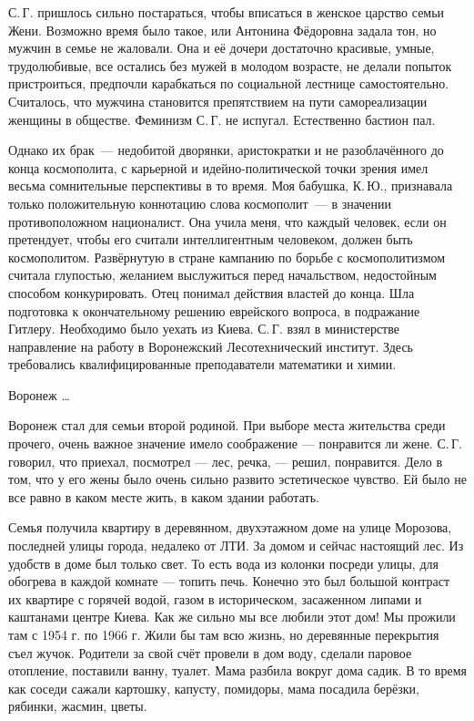 С.\,Г. пришлось сильно постараться, чтобы вписаться в женское царство семьи Жени. Возможно время было такое, или Антонина Фёдоровна задала тон, но мужчин в семье не жаловали. Она и её дочери достаточно красивые, умные, трудолюбивые, все остались без мужей в молодом возрасте, не делали попыток пристроиться, предпочли карабкаться по социальной лестнице самостоятельно. Считалось, что мужчина становится препятствием на пути самореализации женщины в обществе. Феминизм С.\,Г. не испугал. Естественно бастион пал.

Однако их брак~--- недобитой дворянки, аристократки и не разоблачённого до конца космополита,
с карьерной и идейно-полити\-ческой точки зрения имел весьма сомнительные перспективы в то время.
Моя бабушка, К.\,Ю., признавала только положительную коннотацию слова космополит~--- в значении противоположном националист. Она учила меня, что каждый человек, если он претендует, чтобы его считали интеллигентным человеком, должен быть космополитом. Развёрнутую в стране кампанию по борьбе с космополитизмом считала глупостью, желанием выслужиться перед начальством, недостойным способом конкурировать. Отец понимал действия властей до конца. Шла подготовка к окончательному решению еврейского вопроса, в подражание \linebreak Гитлеру. Необходимо было уехать из Киева. С.\,Г. взял в министерстве направление на работу в Воронежский Лесотехнический институт. Здесь требовались квалифицированные преподаватели математики и химии.

Воронеж \ldots

Воронеж стал для семьи второй родиной. При выборе места жительства среди прочего, очень важное значение имело соображение --- понравится ли жене. С.\,Г. говорил, что приехал, посмотрел --- лес, речка, --- решил, понравится. Дело в том, что у его жены было очень сильно развито эстетическое чувство. Ей было не все равно в каком месте жить, в каком здании работать.

Семья получила квартиру в деревянном, двухэтажном доме на улице Морозова, последней улицы города, недалеко от ЛТИ. За домом и сейчас настоящий лес. Из удобств в доме был только свет. То есть вода из колонки посреди улицы, для обогрева в каждой комнате --- топить печь. Конечно это был большой контраст их квартире с горячей водой, газом в историческом, засаженном липами и каштанами центре Киева.
Как же сильно мы все любили этот дом! Мы прожили там с 1954 г. по 1966 г. Жили бы там всю жизнь, но деревянные перекрытия съел жучок. Родители за свой счёт провели в дом воду, сделали паровое отопление, поставили ванну, туалет. Мама разбила вокруг дома садик. В то время как соседи сажали картошку, капусту, помидоры, мама посадила берёзки, рябинки, жасмин, цветы.

